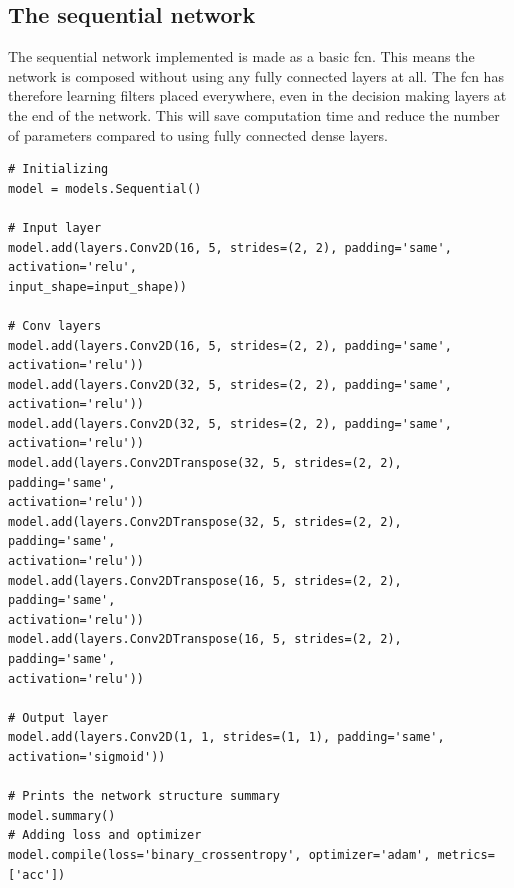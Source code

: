 \documentclass[USenglish]{ifimaster}  %
\begin{document}
\subsection{The sequential network}
The sequential network implemented is made as a basic \ac{fcn}. This means the network is composed without using any fully connected layers at all. The \ac{fcn} has therefore learning filters placed everywhere, even in the decision making layers at the end of the network. This will save computation time and reduce the number of parameters compared to using fully connected dense layers.

\begin{verbatim}
# Initializing
model = models.Sequential()

# Input layer
model.add(layers.Conv2D(16, 5, strides=(2, 2), padding='same', activation='relu', 
input_shape=input_shape))

# Conv layers
model.add(layers.Conv2D(16, 5, strides=(2, 2), padding='same', activation='relu'))
model.add(layers.Conv2D(32, 5, strides=(2, 2), padding='same', activation='relu'))
model.add(layers.Conv2D(32, 5, strides=(2, 2), padding='same', activation='relu'))
model.add(layers.Conv2DTranspose(32, 5, strides=(2, 2), padding='same', 
activation='relu'))
model.add(layers.Conv2DTranspose(32, 5, strides=(2, 2), padding='same', 
activation='relu'))
model.add(layers.Conv2DTranspose(16, 5, strides=(2, 2), padding='same', 
activation='relu'))
model.add(layers.Conv2DTranspose(16, 5, strides=(2, 2), padding='same', 
activation='relu'))

# Output layer
model.add(layers.Conv2D(1, 1, strides=(1, 1), padding='same', activation='sigmoid'))

# Prints the network structure summary
model.summary()
# Adding loss and optimizer
model.compile(loss='binary_crossentropy', optimizer='adam', metrics=['acc'])
\end{verbatim}
\end{document}
